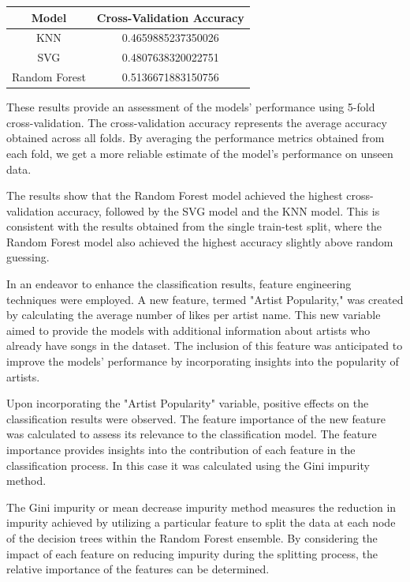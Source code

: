 \documentclass[11pt]{article} %
\begin{document}
\begin{table}[H]
	\centering
	\begin{tabular}{cc}
		\hline
		\textbf{Model} & \textbf{Cross-Validation Accuracy} \\
		\hline
		KNN            & 0.4659885237350026                 \\
		SVG            & 0.4807638320022751                 \\
		Random Forest  & 0.5136671883150756                 \\
		\hline
	\end{tabular}
\end{table}


These results provide an assessment of the models' performance using 5-fold cross-validation. The cross-validation accuracy represents the average accuracy obtained across all folds.
By averaging the performance metrics obtained from each fold, we get a more reliable estimate of the model's performance on unseen data.

The results show that the Random Forest model achieved the highest cross-validation accuracy, followed by the SVG model and the KNN model. This is consistent with the results obtained from the single train-test split, where the Random Forest model also achieved the highest accuracy slightly above random guessing.

\newblock

In an endeavor to enhance the classification results, feature engineering techniques were employed. A new feature, termed "Artist Popularity," was created by calculating the average number of likes per artist name. This new variable aimed to provide the models with additional information about artists who already have songs in the dataset. The inclusion of this feature was anticipated to improve the models' performance by incorporating insights into the popularity of artists.

Upon incorporating the "Artist Popularity" variable, positive effects on the classification results were observed. The feature importance of the new feature was calculated to assess its relevance to the classification model. The feature importance provides insights into the contribution of each feature in the classification process. In this case it was calculated using the Gini impurity method.

The Gini impurity or mean decrease impurity method measures the reduction in impurity achieved by utilizing a particular feature to split the data at each node of the decision trees within the Random Forest ensemble. By considering the impact of each feature on reducing impurity during the splitting process, the relative importance of the features can be determined.
\end{document}
